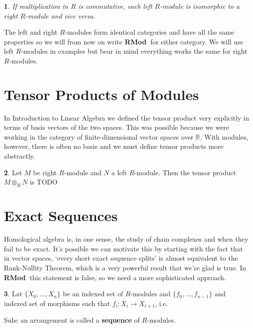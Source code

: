 \documentclass[oneside,english]{amsbook}
\numberwithin{section}{chapter}
\theoremstyle{plain}
\newtheorem{thm}{\protect\theoremname}
\theoremstyle{definition}
\newtheorem{defn}[thm]{\protect\definitionname}
\providecommand{\definitionname}{Definition}
\providecommand{\theoremname}{Theorem}
\newcommand{\catname}[1]{{\normalfont\textbf{#1}}}
\newcommand{\RMod}{\catname{RMod\ }}
\begin{document}
		\begin{thm}
			If multiplication in $R$ is commutative, each left $R$-module is isomorphic to a right $R$-module and \textit{vice versa}.
		\end{thm}
		
		The left and right $R$-modules form identical categories and have all the same properties so we will from now on write \RMod for either category. We will use left $R$-modules in examples but bear in mind everything works the same for right $R$-modules.

	\section{Tensor Products of Modules}

		In Introduction to Linear Algebra we defined the tensor product very explicitly in terms of basis vectors of the two spaces. This was possible because we were working in the category of finite-dimensional vector spaces over $\mathbb{R}$. With modules, however, there is often no basis and we must define tensor products more abstractly.
		
		\begin{defn}
			Let $M$ be right $R$-module and $N$ a left $R$-module. Then the tensor product $M\otimes_R N$ is TODO
		\end{defn}

	\section{Exact Sequences}
	
		Homological algebra is, in one sense, the study of chain complexes and when they fail to be exact. It's possible we can motivate this by starting with the fact that in vector spaces, `every short exact sequence splits' is almost equivalent to the Rank-Nullity Theorem, which is a very powerful result that we're glad is true. In \RMod this statement is false, so we need a more sophisticated approach.
		
		\begin{defn}
			Lat $\{X_0,\ldots,X_n\}$ be an indexed set of $R$-modules and $\{f_0,\ldots,f_{n-1}\}$ and indexed set of morphisms such that $f_i:X_i\to X_{i+1}$, i.e. 
			\begin{center}
			\end{center}					
			Suhc an arrangement is called a \textbf{sequence} of $R$-modules.
		\end{defn}
		
\end{document}
